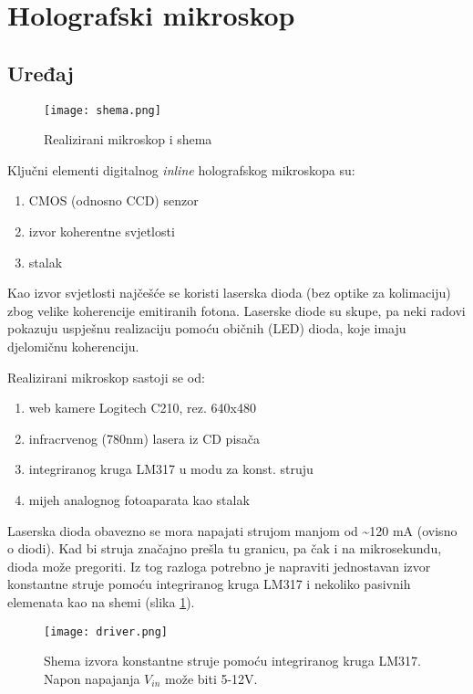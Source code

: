 \documentclass[hidelinks]{ferseminar}
\begin{document}
\section{Holografski mikroskop}
\subsection{Uređaj}
\begin{figure}
\centering
\texttt{[image: shema.png]}
\caption{Realizirani mikroskop i shema}
\end{figure}
Ključni elementi digitalnog \textit{inline} holografskog mikroskopa su: 
\begin{enumerate}
	\item CMOS (odnosno CCD) senzor
	\item izvor koherentne svjetlosti
	\item stalak
\end{enumerate}
Kao izvor svjetlosti najčešće se koristi laserska dioda (bez optike za kolimaciju) zbog velike koherencije emitiranih fotona. Laserske diode su skupe, pa neki radovi pokazuju uspješnu realizaciju pomoću običnih (LED) dioda, koje imaju djelomičnu koherenciju.

Realizirani mikroskop sastoji se od:
\begin{enumerate}
	\item web kamere Logitech C210, rez. 640x480
	\item infracrvenog (780nm) lasera iz CD pisača
	\item integriranog kruga LM317 u modu za konst. struju
	\item mijeh analognog fotoaparata kao stalak
\end{enumerate}
Laserska dioda obavezno se mora napajati strujom manjom od \textasciitilde120 mA (ovisno o diodi). Kad bi struja značajno prešla tu granicu, pa čak i na mikrosekundu, dioda može pregoriti. Iz tog razloga potrebno je napraviti jednostavan izvor konstantne struje pomoću integriranog kruga LM317 i nekoliko pasivnih elemenata kao na shemi (slika \ref{driver}).
\begin{figure}
\centering
\texttt{[image: driver.png]}
\caption{Shema izvora konstantne struje pomoću integriranog kruga LM317. Napon napajanja $V_{in}$ može biti 5-12V.}
\label{driver}
\end{figure}
\end{document}
